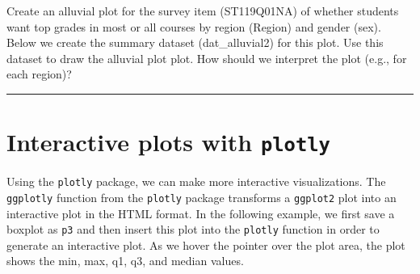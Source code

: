 \documentclass[
]{book}
\newenvironment{Shaded}{\begin{snugshade}}{\end{snugshade}}
\newcommand{\AttributeTok}[1]{\textcolor[rgb]{0.77,0.63,0.00}{#1}}
\newcommand{\ErrorTok}[1]{\textcolor[rgb]{0.64,0.00,0.00}{\textbf{#1}}}
\newcommand{\FunctionTok}[1]{\textcolor[rgb]{0.00,0.00,0.00}{#1}}
\newcommand{\NormalTok}[1]{#1}
\newcommand{\OtherTok}[1]{\textcolor[rgb]{0.56,0.35,0.01}{#1}}
\newcommand{\SpecialCharTok}[1]{\textcolor[rgb]{0.00,0.00,0.00}{#1}}
\newcommand{\StringTok}[1]{\textcolor[rgb]{0.31,0.60,0.02}{#1}}
\begin{document}
Create an alluvial plot for the survey item (ST119Q01NA) of whether students want top grades in most or all courses by region (Region) and gender (sex). Below we create the summary dataset (dat\_alluvial2) for this plot. Use this dataset to draw the alluvial plot plot. How should we interpret the plot (e.g., for each region)?

\begin{Shaded}
\end{Shaded}

\begin{center}\rule{0.5\linewidth}{0.5pt}\end{center}

\hypertarget{interactive-plots-with-plotly}{%
\section{\texorpdfstring{Interactive plots with \texttt{plotly}}{Interactive plots with plotly}}\label{interactive-plots-with-plotly}}

Using the \texttt{plotly} package, we can make more interactive visualizations. The \texttt{ggplotly} function from the \texttt{plotly} package transforms a \texttt{ggplot2} plot into an interactive plot in the HTML format. In the following example, we first save a boxplot as \texttt{p3} and then insert this plot into the \texttt{plotly} function in order to generate an interactive plot. As we hover the pointer over the plot area, the plot shows the min, max, q1, q3, and median values.
\end{document}

